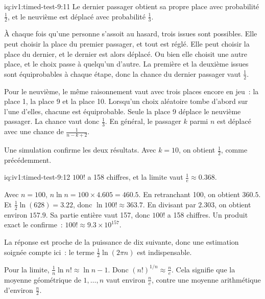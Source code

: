 \begin{solution}{iq:iv1:timed-test-9:11}
Le dernier passager obtient sa propre place avec probabilité $\frac12$, et le neuvième est déplacé avec probabilité $\frac13$.

À chaque fois qu'une personne s'assoit au hasard, trois issues sont possibles. Elle peut choisir la place du premier passager, et tout est réglé. Elle peut choisir la place du dernier, et le dernier est alors déplacé. Ou bien elle choisit une autre place, et le choix passe à quelqu'un d'autre. La première et la deuxième issues sont équiprobables à chaque étape, donc la chance du dernier passager vaut $\frac12$.

Pour le neuvième, le même raisonnement vaut avec trois places encore en jeu~: la place 1, la place 9 et la place 10. Lorsqu'un choix aléatoire tombe d'abord sur l'une d'elles, chacune est équiprobable. Seule la place 9 déplace le neuvième passager. La chance vaut donc $\frac13$. En général, le passager $k$ parmi $n$ est déplacé avec une chance de $\frac{1}{n - k + 2}$.

Une simulation confirme les deux résultats. Avec $k = 10$, on obtient $\frac12$, comme précédemment.

\end{solution}

\begin{solution}{iq:iv1:timed-test-9:12}
$100!$ a 158 chiffres, et la limite vaut $\frac1e \approx 0.368$.

Avec $n = 100$, $n\ln n = 100 \times 4.605 = 460.5$. En retranchant 100, on obtient $360.5$. Et $\frac12\ln(628) = 3.22$, donc $\ln 100! \approx 363.7$. En divisant par $2.303$, on obtient environ $157.9$. Sa partie entière vaut 157, donc $100!$ a 158 chiffres. Un produit exact le confirme~: $100! \approx 9.3 \times 10^{157}$.

La réponse est proche de la puissance de dix suivante, donc une estimation soignée compte ici~: le terme $\frac12\ln(2\pi n)$ est indispensable.

Pour la limite, $\frac1n\ln n! \approx \ln n - 1$. Donc $(n!)^{1/n} \approx \frac{n}{e}$. Cela signifie que la moyenne géométrique de $1, \dots, n$ vaut environ $\frac{n}{e}$, contre une moyenne arithmétique d'environ $\frac{n}{2}$.

\end{solution}
